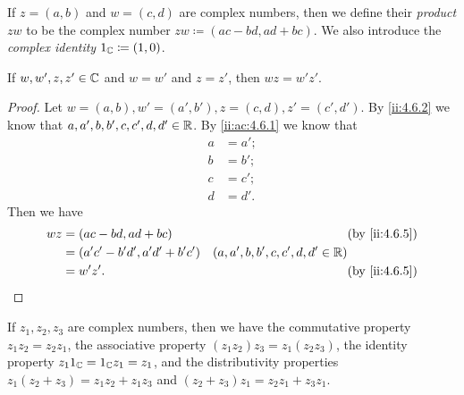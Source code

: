\begin{defn}\label{ii:4.6.5}
  If \(z = (a, b)\) and \(w = (c, d)\) are complex numbers, then we define their \emph{product} \(zw\) to be the complex number \(zw \coloneqq (ac - bd, ad + bc)\).
  We also introduce the \emph{complex identity} \(1_{\mathbb{C}} \coloneqq (1, 0)\).
\end{defn}

\begin{ac}\label{ii:ac:4.6.3}
  If \(w, w', z, z' \in \mathbb{C}\) and \(w = w'\) and \(z = z'\), then \(wz = w'z'\).
\end{ac}

\begin{proof}
  Let \(w = (a, b), w' = (a', b'), z = (c, d), z' = (c', d')\).
  By \cref{ii:4.6.2} we know that \(a, a', b, b', c, c', d, d' \in \mathbb{R}\).
  By \cref{ii:ac:4.6.1} we know that
  \begin{align*}
    a & = a'; \\
    b & = b'; \\
    c & = c'; \\
    d & = d'.
  \end{align*}
  Then we have
  \begin{align*}
    wz & = (ac - bd, ad + bc)             &                                     & \by{ii:4.6.5} \\
       & = (a' c' - b' d', a' d' + b' c') & (a, a', b, b', c, c', d, d' \in \R)                 \\
       & = w' z'.                         &                                     & \by{ii:4.6.5}
  \end{align*}
\end{proof}

\begin{lem}\label{ii:4.6.6}
  If \(z_1, z_2, z_3\) are complex numbers, then we have the commutative property \(z_1 z_2 = z_2 z_1\), the associative property \((z_1 z_2) z_3 = z_1 (z_2 z_3)\), the identity property \(z_1 1_{\mathbb{C}} = 1_{\mathbb{C}} z_1 = z_1\), and the distributivity properties \(z_1 (z_2 + z_3) = z_1 z_2 + z_1 z_3\) and \((z_2 + z_3) z_1 = z_2 z_1 + z_3 z_1\).
\end{lem}

